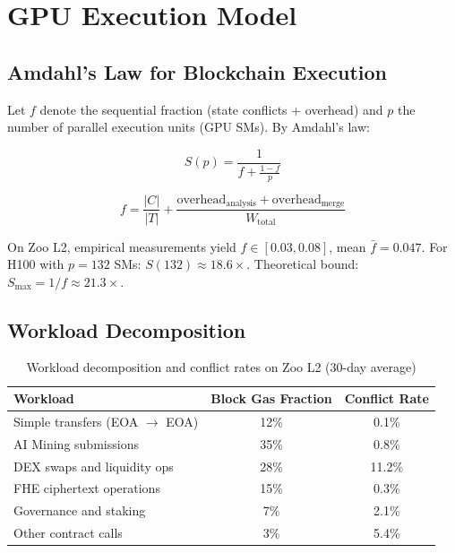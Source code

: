 \section{GPU Execution Model}

\label{sec:gpu-model}

\subsection{Amdahl's Law for Blockchain Execution}

Let $f$ denote the sequential fraction (state conflicts + overhead) and $p$ the number of parallel execution units (GPU SMs).
By Amdahl's law:

\begin{equation}
S(p) = \frac{1}{f + \frac{1-f}{p}}
\label{eq:amdahl}
\end{equation}

\begin{definition}
\begin{equation}
f = \frac{|C|}{|T|} + \frac{\text{overhead}_{\text{analysis}} + \text{overhead}_{\text{merge}}}{W_{\text{total}}}
\end{equation}
\end{definition}

On Zoo L2, empirical measurements yield $f \in [0.03, 0.08]$, mean $\bar{f} = 0.047$.
For H100 with $p = 132$ SMs: $S(132) \approx 18.6\times$.
Theoretical bound: $S_{\max} = 1/f \approx 21.3\times$.

\subsection{Workload Decomposition}

\begin{table}[h]
\centering
\begin{tabular}{lcc}
\toprule
\textbf{Workload} & \textbf{Block Gas Fraction} & \textbf{Conflict Rate} \\
\midrule
Simple transfers (EOA $\to$ EOA) & 12\% & 0.1\% \\
AI Mining submissions & 35\% & 0.8\% \\
DEX swaps and liquidity ops & 28\% & 11.2\% \\
FHE ciphertext operations & 15\% & 0.3\% \\
Governance and staking & 7\% & 2.1\% \\
Other contract calls & 3\% & 5.4\% \\
\bottomrule
\end{tabular}
\caption{Workload decomposition and conflict rates on Zoo L2 (30-day average)}
\label{tab:workload}
\end{table}

